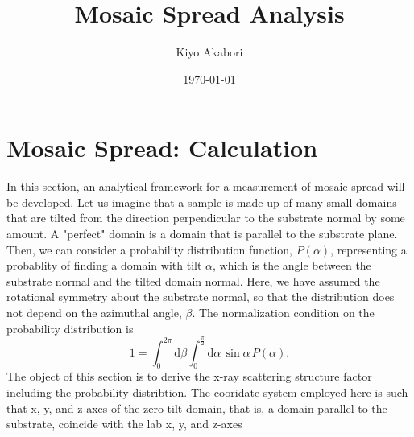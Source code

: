 \documentclass[12pt,letterpaper]{article}
\author{Kiyo Akabori}
\title{Mosaic Spread Analysis}
\date{\today}
\begin{document}
\maketitle



\section{Mosaic Spread: Calculation}
In this section, an analytical framework for a measurement of mosaic spread will 
be developed. Let us imagine that a sample is made up of many small domains that are 
tilted from the direction perpendicular to the substrate normal by some amount. 
A "perfect" domain is a domain that is parallel to the substrate plane.
Then, we can consider a probability distribution function, $P(\alpha)$, 
representing a probablity of finding a domain with tilt $\alpha$, which is the angle
between the substrate normal and the tilted domain normal. Here, we have
assumed the rotational symmetry about the substrate normal, so that the distribution
does not depend on the azimuthal angle, $\beta$. The normalization condition on the probability distribution is 
\begin{equation}
  1 = \int_0^{2\pi} \!\! \mathrm{d}\beta  \int_0^{\frac{\pi}{2}} \! \mathrm{d}\alpha \, 
      \sin\alpha \, P(\alpha).
\end{equation}
The object of this section is to derive the x-ray scattering structure factor 
including the probability distribtion. The cooridate system employed here is such that x, y, and
z-axes of the zero tilt domain, that is, a domain parallel to the substrate, 
coincide with the lab x, y, and z-axes 
\end{document}
